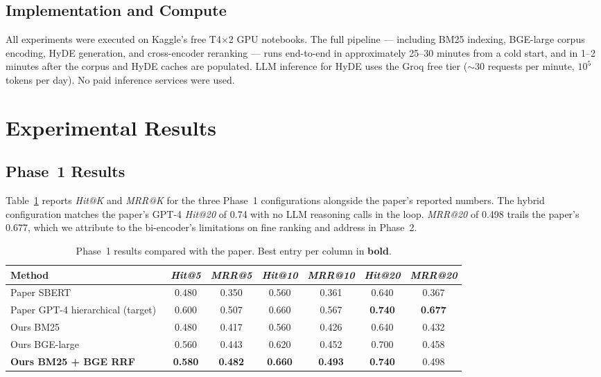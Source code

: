 \documentclass[10pt,a4paper,twocolumn]{article}
\begin{document}
\subsection{Implementation and Compute}

All experiments were executed on Kaggle's free T4$\times$2 GPU
notebooks. The full pipeline --- including BM25 indexing, BGE-large
corpus encoding, HyDE generation, and cross-encoder reranking --- runs
end-to-end in approximately 25--30 minutes from a cold start, and in
1--2 minutes after the corpus and HyDE caches are populated. LLM
inference for HyDE uses the Groq free tier ($\sim$30 requests per
minute, $10^5$ tokens per day). No paid inference services were used.

\section{Experimental Results}\label{sec:results}

\subsection{Phase~1 Results}

Table~\ref{tab:phase1} reports \emph{Hit@K} and \emph{MRR@K} for the
three Phase~1 configurations alongside the paper's reported numbers.
The hybrid configuration matches the paper's GPT-4 \emph{Hit@20} of
0.74 with no LLM reasoning calls in the loop. \emph{MRR@20} of 0.498
trails the paper's 0.677, which we attribute to the bi-encoder's
limitations on fine ranking and address in Phase~2.

\begin{table}[t]
\centering
\caption{Phase~1 results compared with the paper. Best entry per
column in \textbf{bold}.}
\label{tab:phase1}
\small
\begin{tabular}{lcccccc}
\toprule
\textbf{Method} & \emph{Hit@5} & \emph{MRR@5} & \emph{Hit@10} & \emph{MRR@10} & \emph{Hit@20} & \emph{MRR@20} \\
\midrule
Paper SBERT~\cite{li2025llm}            & 0.480 & 0.350 & 0.560 & 0.361 & 0.640 & 0.367 \\
Paper GPT-4 hierarchical (target)~\cite{li2025llm} & 0.600 & 0.507 & 0.660 & 0.567 & \textbf{0.740} & \textbf{0.677} \\
\midrule
Ours BM25                               & 0.480 & 0.417 & 0.560 & 0.426 & 0.640 & 0.432 \\
Ours BGE-large                          & 0.560 & 0.443 & 0.620 & 0.452 & 0.700 & 0.458 \\
\textbf{Ours BM25 + BGE RRF}            & \textbf{0.580} & \textbf{0.482} & \textbf{0.660} & \textbf{0.493} & \textbf{0.740} & 0.498 \\
\bottomrule
\end{tabular}
\end{table}
\end{document}
